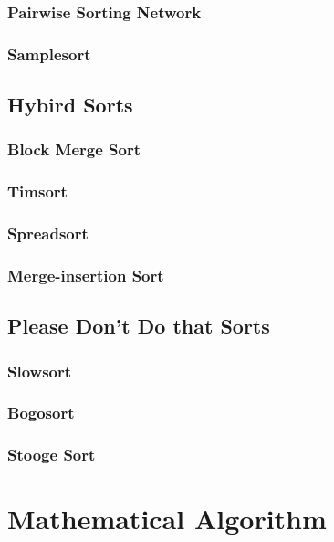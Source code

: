 				\subsection{Pairwise Sorting Network}

				\subsection{Samplesort}

			\section{Hybird Sorts}
				\subsection{Block Merge Sort}

				\subsection{Timsort}

				\subsection{Spreadsort}

				\subsection{Merge-insertion Sort}

			\section{Please Don't Do that Sorts}
				\subsection{Slowsort}

				\subsection{Bogosort}

				\subsection{Stooge Sort}

		\chapter{Mathematical Algorithm}
